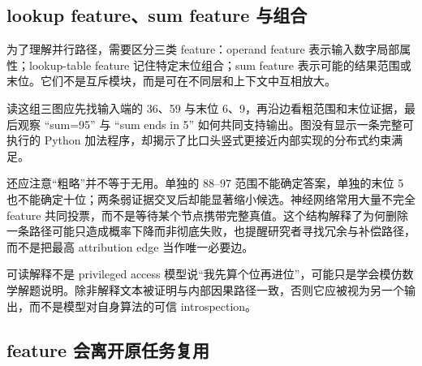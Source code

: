\subsection{lookup feature、sum feature 与组合}

为了理解并行路径，需要区分三类 feature：operand feature 表示输入数字局部属性；lookup-table feature 记住特定末位组合；sum feature 表示可能的结果范围或末位。它们不是互斥模块，而是可在不同层和上下文中互相放大。




读这组三图应先找输入端的 36、59 与末位 6、9，再沿边看粗范围和末位证据，最后观察 “sum=95” 与 “sum ends in 5” 如何共同支持输出。图没有显示一条完整可执行的 Python 加法程序，却揭示了比口头竖式更接近内部实现的分布式约束满足。

还应注意“粗略”并不等于无用。单独的 88--97 范围不能确定答案，单独的末位 5 也不能确定十位；两条弱证据交叉后却能显著缩小候选。神经网络常用大量不完全 feature 共同投票，而不是等待某个节点携带完整真值。这个结构解释了为何删除一条路径可能只造成概率下降而非彻底失败，也提醒研究者寻找冗余与补偿路径，而不是把最高 attribution edge 当作唯一必要边。

\begin{warningbox}{可读解释不是 privileged access}
模型说“我先算个位再进位”，可能只是学会模仿数学解题说明。除非解释文本被证明与内部因果路径一致，否则它应被视为另一个输出，而不是模型对自身算法的可信 introspection。
\end{warningbox}




\subsection{feature 会离开原任务复用}


